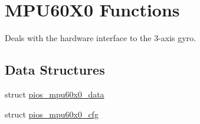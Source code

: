 \hypertarget{group___p_i_o_s___m_p_u60_x0}{\section{\-M\-P\-U60\-X0 \-Functions}
\label{group___p_i_o_s___m_p_u60_x0}
}


\-Deals with the hardware interface to the 3-\/axis gyro.  


\subsection*{\-Data \-Structures}
\begin{DoxyCompactItemize}
\item 
struct \hyperlink{structpios__mpu60x0__data}{pios\-\_\-mpu60x0\-\_\-data}
\item 
struct \hyperlink{structpios__mpu60x0__cfg}{pios\-\_\-mpu60x0\-\_\-cfg}
\end{DoxyCompactItemize}
